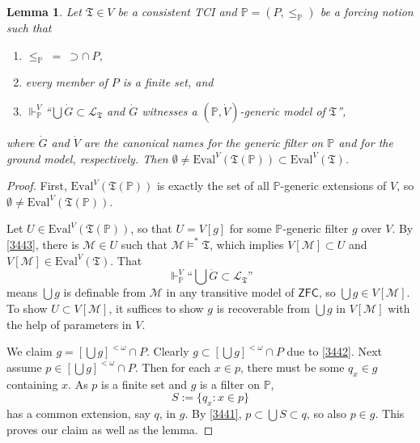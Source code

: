 \documentclass[12pt, twoside]{memoir}
\numberwithin{equation}{section}
\newtheorem{lem}[thm]{Lemma}
\theoremstyle{definition}
\theoremstyle{remark}
\theoremstyle{definition}
\theoremstyle{definition}
\theoremstyle{definition}
\theoremstyle{remark}
\begin{document}
\begin{lem}\label{lem344}
Let $\mathfrak{T} \in V$ be a consistent TCI and $\mathbb{P} = (P, \leq_{\mathbb{P}})$ be a forcing notion such that 
\begin{enumerate}[label=(\arabic*)]
    \item\label{3441} $\leq_{\mathbb{P}} \ = \ \supset \cap \ P$,
    \item\label{3442} every member of $P$ is a finite set, and
    \item\label{3443} $\Vdash_{\mathbb{P}}^V$``$\bigcup \dot{G} \subset \mathcal{L}_{\mathfrak{T}}$ and $\dot{G}$ witnesses a $(\mathbb{P}, \dot{V})$-generic model of $\mathfrak{T}$'',  
\end{enumerate}
where $\dot{G}$ and $\dot{V}$ are the canonical names for the generic filter on $\mathbb{P}$ and for the ground model, respectively. Then $\emptyset \neq \mathrm{Eval}^V(\mathfrak{T}(\mathbb{P})) \subset \mathrm{Eval}^V(\mathfrak{T})$.
\end{lem}

\begin{proof}
First, $\mathrm{Eval}^V(\mathfrak{T}(\mathbb{P}))$ is exactly the set of all $\mathbb{P}$-generic extensions of $V$, so $\emptyset \neq \mathrm{Eval}^V(\mathfrak{T}(\mathbb{P}))$. 

Let $U \in \mathrm{Eval}^V(\mathfrak{T}(\mathbb{P}))$, so that $U = V[g]$ for some $\mathbb{P}$-generic filter $g$ over $V$. By \ref{3443}, there is $\mathcal{M} \in U$ such that $\mathcal{M} \models^* \mathfrak{T}$, which implies $V[\mathcal{M}] \subset U$ and $V[\mathcal{M}] \in \mathrm{Eval}^V(\mathfrak{T})$. That 
\begin{equation*}
    \Vdash_{\mathbb{P}}^V \text{``} \bigcup \dot{G} \subset \mathcal{L}_{\mathfrak{T}} \text{''}
\end{equation*}
means $\bigcup g$ is definable from $\mathcal{M}$ in any transitive model of $\mathsf{ZFC}$, so $\bigcup g \in V[\mathcal{M}]$. To show $U \subset V[\mathcal{M}]$, it suffices to show $g$ is recoverable from $\bigcup g$ in $V[\mathcal{M}]$ with the help of parameters in $V$. 

We claim $g = [\bigcup g]^{< \omega} \cap P$. Clearly $g \subset [\bigcup g]^{< \omega} \cap P$ due to \ref{3442}. Next assume $p \in [\bigcup g]^{< \omega} \cap P$. Then for each $x \in p$, there must be some $q_x \in g$ containing $x$. As $p$ is a finite set and $g$ is a filter on $\mathbb{P}$, 
\begin{equation*}
    S := \{q_x : x \in p\}
\end{equation*}
has a common extension, say $q$, in $g$. By \ref{3441}, $p \subset \bigcup S \subset q$, so also $p \in g$. This proves our claim as well as the lemma.
\end{proof}
\end{document}
